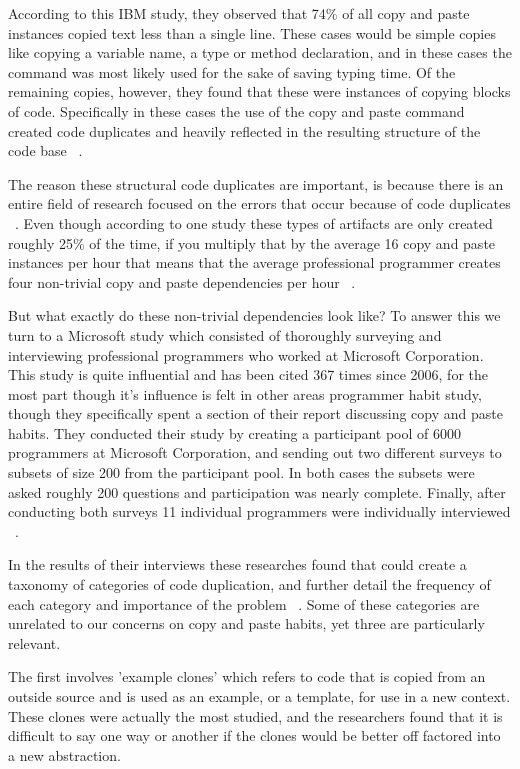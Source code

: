 \documentclass{acm_proc_article-sp}
\begin{document}
According to this IBM study, they observed that 74\% of all copy and paste instances copied text less than a single line. These cases would be simple copies like copying a variable name, a type or method declaration, and in these cases the command was most likely used for the sake of saving typing time. Of the remaining copies, however, they found that these were instances of copying blocks of code. Specifically in these cases the use of the copy and paste command created code duplicates and heavily reflected in the resulting structure of the code base ~\cite{ooplCP}.

The reason these structural code duplicates are important, is because there is an entire field of research focused on the errors that occur because of code duplicates ~\cite{devWorkHabits}. Even though according to one study these types of artifacts are only created roughly 25\% of the time, if you multiply that by the average 16 copy and paste instances per hour that means that the average professional programmer creates four non-trivial copy and paste dependencies per hour ~\cite{ooplCP}. 

But what exactly do these non-trivial dependencies look like? To answer this we turn to a Microsoft study which consisted of thoroughly surveying and interviewing professional programmers who worked at Microsoft Corporation. This study is quite influential and has been cited 367 times since 2006, for the most part though it's influence is felt in other areas programmer habit study, though they specifically spent a section of their report discussing copy and paste habits. They conducted their study by creating a participant pool of 6000 programmers at Microsoft Corporation, and sending out two different surveys to subsets of size 200 from the participant pool. In both cases the subsets were asked roughly 200 questions and participation was nearly complete. Finally, after conducting both surveys 11 individual programmers were individually interviewed ~\cite{devWorkHabits}. 

In the results of their interviews these researches found that could create a taxonomy of categories of code duplication, and further detail the frequency of each category and importance of the problem ~\cite{devWorkHabits}. Some of these categories are unrelated to our concerns on copy and paste habits, yet three are particularly relevant. 

The first involves 'example clones' which refers to code that is copied from an outside source and is used as an example, or a template, for use in a new context. These clones were actually the most studied, and the researchers found that it is difficult to say one way or another if the clones would be better off factored into a new abstraction. 
\end{document}
